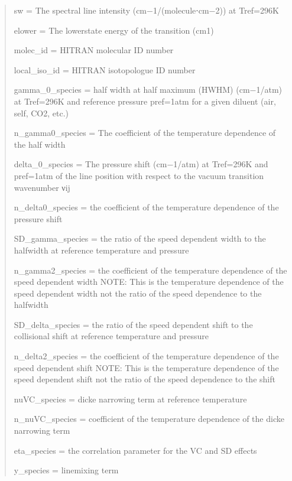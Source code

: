 \documentclass[letterpaper,10pt,english]{sphinxmanual}
\begin{document}
\begin{fulllineitems}
\begin{quote}
\begin{description}
\begin{itemize}
\begin{description}
\sphinxAtStartPar
sw = The spectral line intensity (cm−1/(molecule⋅cm−2)) at Tref=296K

\sphinxAtStartPar
elower = The lower\sphinxhyphen{}state energy of the transition (cm\sphinxhyphen{}1)

\sphinxAtStartPar
molec\_id = HITRAN molecular ID number

\sphinxAtStartPar
local\_iso\_id = HITRAN isotopologue ID number

\sphinxAtStartPar
gamma\_0\_species = half width at half maximum (HWHM) (cm−1/atm) at Tref=296K and reference pressure pref=1atm for a given diluent (air, self, CO2, etc.)

\sphinxAtStartPar
n\_gamma0\_species = The coefficient of the temperature dependence of the half width

\sphinxAtStartPar
delta\_0\_species = The pressure shift (cm−1/atm) at Tref=296K and pref=1atm of the line position with respect to the vacuum transition wavenumber νij

\sphinxAtStartPar
n\_delta0\_species = the coefficient of the temperature dependence of the pressure shift

\sphinxAtStartPar
SD\_gamma\_species = the ratio of the speed dependent width to the half\sphinxhyphen{}width at reference temperature and pressure

\sphinxAtStartPar
n\_gamma2\_species = the coefficient of the temperature dependence of the speed dependent width NOTE: This is the temperature dependence of the speed dependent width not the ratio of the speed dependence to the half\sphinxhyphen{}width

\sphinxAtStartPar
SD\_delta\_species = the ratio of the speed dependent shift to the collisional shift at reference temperature and pressure

\sphinxAtStartPar
n\_delta2\_species = the coefficient of the temperature dependence of the speed dependent shift NOTE: This is the temperature dependence of the speed dependent shift not the ratio of the speed dependence to the shift

\sphinxAtStartPar
nuVC\_species = dicke narrowing term at reference temperature

\sphinxAtStartPar
n\_nuVC\_species = coefficient of the temperature dependence of the dicke narrowing term

\sphinxAtStartPar
eta\_species = the correlation parameter for the VC and SD effects

\sphinxAtStartPar
y\_species = linemixing term


\end{description}
\end{itemize}
\end{description}
\end{quote}
\end{fulllineitems}
\end{document}
